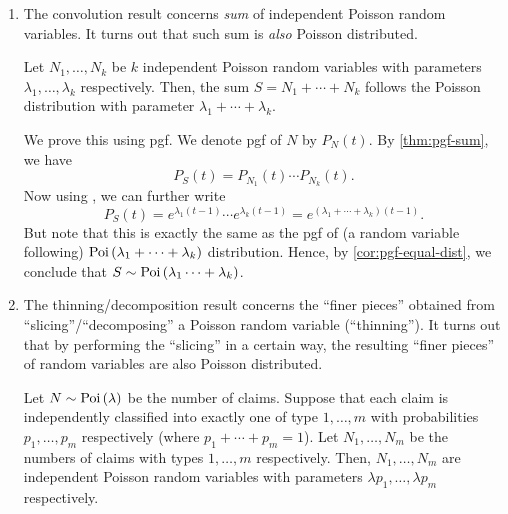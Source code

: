 \begin{enumerate}
\item The convolution result concerns \emph{sum} of independent Poisson random
variables. It turns out that such sum is \emph{also} Poisson distributed.
\begin{theorem}
\label{thm:pois-convolution}
Let \(N_1,\dotsc,N_k\) be \(k\) independent Poisson random variables with
parameters \(\lambda_1,\dotsc,\lambda_k\) respectively. Then, the sum
\(S=N_1+\dotsb+N_k\) follows the Poisson distribution with parameter
\(\lambda_1+\dotsb+\lambda_k\).
\end{theorem}
\begin{pf}
We prove this using pgf. We denote pgf of \(N\) by \(P_N(t)\).  By
\cref{thm:pgf-sum}, we have
\[
P_S(t)=P_{N_1}(t)\dotsb P_{N_k}(t).
\]
Now using , we can further write
\[
P_S(t)=e^{\lambda_1(t-1)}\dotsb e^{\lambda_k(t-1)}
=e^{(\lambda_1+\dotsb+\lambda_k)(t-1)}.
\]
But note that this is exactly the same as the pgf of (a random variable
following) \(\operatorname{Poi}\left(\lambda_1+\dotsb+\lambda_k\right)\) distribution. Hence, by
\cref{cor:pgf-equal-dist}, we conclude that
\(S\sim\operatorname{Poi}\left(\lambda_1\dotsb+\lambda_k\right)\).
\end{pf}
\item The thinning/decomposition result concerns the ``finer pieces'' obtained
from ``slicing''/``decomposing'' a Poisson random variable (``thinning'').  It
turns out that by performing the ``slicing'' in a certain way, the resulting
``finer pieces'' of random variables are also Poisson distributed.

\begin{theorem}
\label{thm:pois-thinning}
Let \(N\sim\operatorname{Poi}\left(\lambda\right)\) be the number of claims. Suppose that each claim is
independently classified into exactly one of type \(1,\dotsc,m\) with
probabilities \(p_1,\dotsc,p_m\) respectively (where \(p_1+\dotsb+p_m=1\)). Let
\(N_1,\dotsc,N_m\) be the numbers of claims with types \(1,\dotsc,m\)
respectively. Then, \(N_1,\dotsc,N_m\) are independent Poisson random variables
with parameters \(\lambda p_1,\dotsc,\lambda p_m\) respectively.
\end{theorem}
\begin{center}
\end{center}
\end{enumerate}
